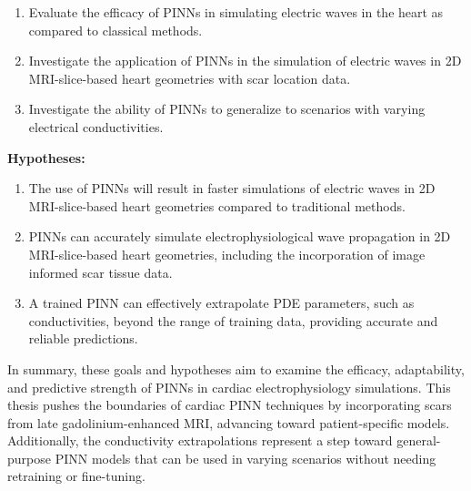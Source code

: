 \begin{enumerate}
    \item  Evaluate the efficacy of PINNs in simulating electric waves in the heart as compared to classical methods.\\

    \item  Investigate the application of PINNs in the simulation of electric waves in 2D MRI-slice-based heart geometries with scar location data.\\

    \item  Investigate the ability of PINNs to generalize to scenarios with varying electrical conductivities.\\
    
\end{enumerate}

\textbf{Hypotheses:}

\begin{enumerate}
    \item  The use of PINNs will result in faster simulations of electric waves in  2D MRI-slice-based heart geometries compared to traditional methods.\\
    

    \item  PINNs can accurately simulate electrophysiological wave propagation in 2D MRI-slice-based heart geometries, including the incorporation of image informed scar tissue data.\\
    

    \item  A trained PINN can effectively extrapolate PDE parameters, such as conductivities, beyond the range of training data, providing accurate and reliable predictions.\\
    
\end{enumerate}


In summary, these goals and hypotheses aim to examine the efficacy, adaptability, and predictive strength of PINNs in cardiac electrophysiology simulations. This thesis pushes the boundaries of cardiac PINN techniques by incorporating scars from late gadolinium-enhanced MRI, advancing toward patient-specific models. Additionally, the conductivity extrapolations represent a step toward general-purpose PINN models that can be used in varying scenarios without needing retraining or fine-tuning.





